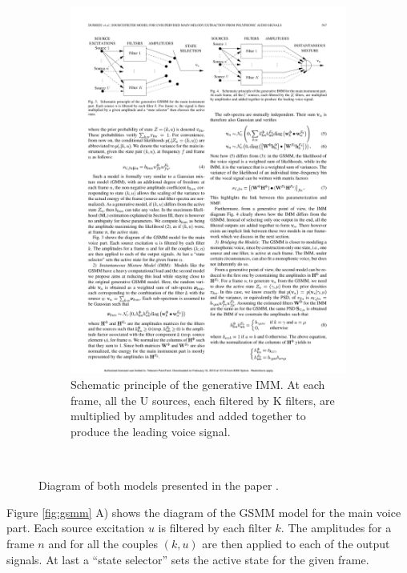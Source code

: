 \begin{figure}
\begin{subfigure}[b]{0.47\textwidth}
                \includegraphics[width=\textwidth]{Figures/imm}
                \caption{Schematic principle of the generative IMM. At each frame, all the U sources, each filtered by K filters, are multiplied by amplitudes and added together to produce the leading voice signal.}
                \label{fig:imm}
        \end{subfigure}
          \caption{Diagram of both models presented in the paper \cite{durrieu}.}
        ~ %
        \label{fig:gsmmimm}
\end{figure}

Figure \ref{fig:gsmm}  A) shows the diagram of the GSMM model for the main voice part. Each source excitation $u$ is filtered by each filter $k$. The amplitudes for a frame $n$ and for all the couples $(k, u)$ are then applied to each of the output signals. At last a ``state selector'' sets the active state for the given frame.

